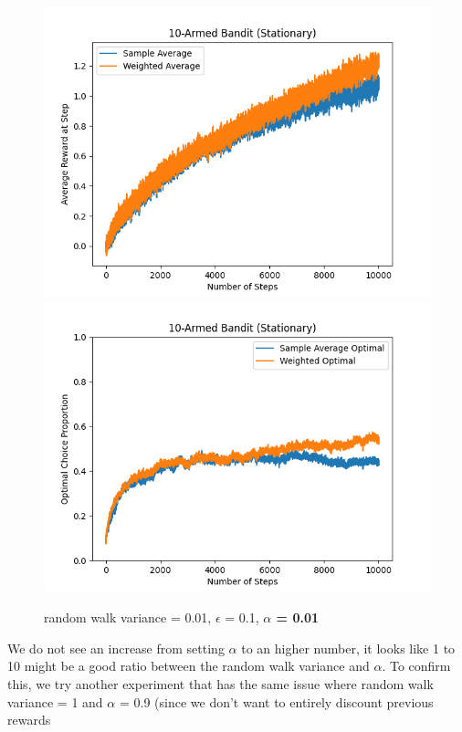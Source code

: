 \documentclass{article}
\begin{document}
\begin{figure}[h!]
\centering
\includegraphics[scale=.6]{RL_A1_pics/alpha/0.01.png}
\includegraphics[scale=.6]{RL_A1_pics/alpha/optimal/0.01.png}
\caption{random walk variance = 0.01, $\epsilon$ = 0.1, \textbf{$\alpha$ = 0.01}}
\label{fig:10-Armed1}
\end{figure}

\newpage
We do not see an increase from setting $\alpha$ to an higher number, it looks like 1 to 10 might be a good ratio between the random walk variance and $\alpha$. To confirm this, we try another experiment that has the same issue where random walk variance = 1 and $\alpha$ = 0.9 (since we don't want to entirely discount previous rewards
\end{document}
